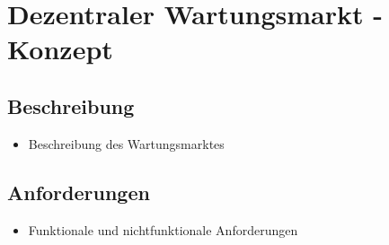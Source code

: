 \chapter{Dezentraler Wartungsmarkt - Konzept}
\label{cha:fazit}

\section{Beschreibung}
\begin{itemize}
    \item Beschreibung des Wartungsmarktes
\end{itemize}

\section{Anforderungen}
\begin{itemize}
    \item Funktionale und nichtfunktionale Anforderungen
\end{itemize}
